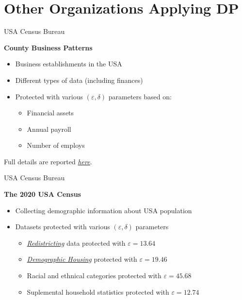 \documentclass[12pt,aspectratio=169,handout]{beamer}
\begin{document}

\section{Other Organizations Applying DP}


\begin{frame}{USA Census Bureau}

\textbf{County Business Patterns} \vskip1mm

\begin{itemize} \setlength\itemsep{2mm}
%
\item Business establishments in the USA
%
\item Different types of data (including finances) 
%
\item Protected with various $(\varepsilon, \delta)$ parameters based on:
%
	\begin{itemize} \setlength\itemsep{2mm}
	\item Financial assets
	\item Annual payroll 
	\item Number of employs 
	\end{itemize}
%
\end{itemize}

Full details are reported {\it \href{https://www.census.gov/topics/business-economy/disclosure/data/tables/cbp-privacy-demonstration-tables.html}{here}}.

\end{frame}


\begin{frame}{USA Census Bureau}

\textbf{The 2020 USA Census} \vskip1mm

\begin{itemize}
%
\item Collecting demographic information about USA population \vskip1mm
%
\item Datasets protected with various $(\varepsilon, \delta)$ parameters \vskip1mm
%
	\begin{itemize} \setlength\itemsep{2mm}
	\item {\it \href{https://www.census.gov/programs-surveys/decennial-census/about/rdo/summary-files.html}{Redistricting}} data protected with $\varepsilon = 13.64$
	\item {\it \href{https://www.census.gov/data/tables/2023/dec/2020-census-dhc.html}{Demographic Housing}} protected with $\varepsilon = 19.46$
	\item Racial and ethnical categories protected with $\varepsilon = 45.68$
	\item Suplemental household statistics protected with $\varepsilon = 12.74$
	\end{itemize}
%
\end{itemize}

\end{frame}
\end{document}
